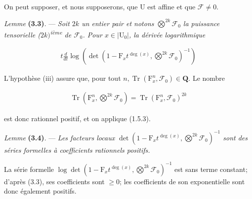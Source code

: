 \documentclass[10pt,leqno]{article}
\begin{document}
\par

\noindent On peut supposer, et nous supposerons, que \(\mathrm{U}\) est affine et que \(\mathcal{F} \ne 0\).\par

\noindent \emph{Lemme} \textbf{(3.3)}. — {\itshape Soit \(2k\) un entier pair et notons \(\bigotimes\limits^{2k}\mathcal{F} _{0}\) la puissance tensorielle (\(2k)\)\textsuperscript{ième} de \(\mathcal{F} _{0}\). Pour \(x\in |\mathrm{U}_{0}|\), la dérivée logarithmique}\par

\begin{equation*}\begin{gathered}t \frac{d}{dt} \operatorname{log}(\operatorname{det}(1- \mathrm{F}_{x} t^{\operatorname{deg}(x)},\bigotimes\limits^{2k}\mathcal{F} _{0})^{- 1})\end{gathered}\end{equation*}

\par

\noindent L’hypothèse (iii) assure que, pour tout \(n, \operatorname{Tr}(\mathrm{F}_{x}^{n},\mathcal{F} _{0})\in \mathbf{Q}\). Le nombre\par

\begin{equation*}\begin{gathered}\operatorname{Tr}(\mathrm{F}_{x}^{n},\bigotimes\limits^{2k}\mathcal{F} _{0}) = \operatorname{Tr}(\mathrm{F}_{x}^{n},\mathcal{F} _{0})^{2k}\end{gathered}\end{equation*}

\noindent est donc rationnel positif, et on applique (1.5.3).\par

\noindent \emph{Lemme} \textbf{(3.4)}. — {\itshape Les facteurs locaux \(\operatorname{det}(1- \mathrm{F}_{x} t^{\operatorname{deg}(x)},\bigotimes\limits^{2k}\mathcal{F} _{0})^{- 1}\) sont des séries formelles à coefficients rationnels positifs.}\par

\noindent La série formelle \(\operatorname{log} \operatorname{det}(1- \mathrm{F}_{x} t^{\operatorname{deg}(x)},\bigotimes\limits^{2k}\mathcal{F} _{0})^{- 1}\) est sans terme constant; d’après (3.3), ses coefficients sont \(\geq 0\); les coefficients de son exponentielle sont donc également positifs.\par
\end{document}

